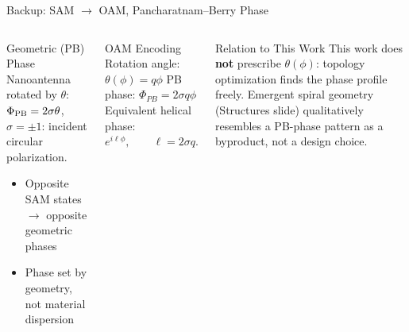 \documentclass[aspectratio=169, 10pt]{beamer}
\begin{document}
\begin{frame}{Backup: SAM $\to$ OAM, Pancharatnam--Berry Phase}
  \begin{columns}[T]
      \begin{block}{Geometric (PB) Phase}
        Nanoantenna rotated by $\theta$:
        $\Phi_{\rm PB} = 2 \sigma \theta$, 
        $\sigma = \pm 1$: incident circular polarization.
        \begin{itemize}
          \item Opposite SAM states $\to$ opposite geometric phases
          \item Phase set by geometry, not material dispersion
        \end{itemize}
      \end{block}
      \vspace{1pt}
      \begin{exampleblock}{OAM Encoding}
		Rotation angle:
		$\theta(\phi)=q\phi$
		PB phase:
		$\Phi_{PB}=2\sigma q\phi$
		Equivalent helical phase:
		$e^{i\ell\phi},\qquad \ell=2\sigma q.$
      \end{exampleblock}
      \vspace{1pt}
      \begin{alertblock}{Relation to This Work}
        This work does \textbf{not} prescribe $\theta(\phi)$: topology optimization finds the phase profile freely. Emergent spiral geometry (Structures slide) qualitatively resembles a PB-phase pattern as a byproduct, not a design choice.
      \end{alertblock}
      \centering
  \end{columns}
\end{frame}
\end{document}
